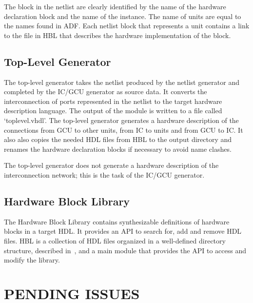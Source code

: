 \documentclass[a4paper,twoside]{tce}
\begin{document}
The block in the netlist are clearly identified by the name of the hardware
declaration block and the name of the instance. The name of units are equal
to the names found in ADF. Each netlist block that represents a unit
contains a link to the file in HBL that describes the hardware
implementation of the block.

\section{Top-Level Generator}

The top-level generator takes the netlist produced by the netlist generator
and completed by the IC/GCU generator as source data. It converts the
interconnection of ports represented in the netlist to the target hardware
description language. The output of the module is written to a file called
`toplevel.vhdl'.
%
The top-level generator generates a hardware description of the connections
from GCU to other units, from IC to units and from GCU to IC. It also also
copies the needed HDL files from HBL to the output directory and renames the
hardware declaration blocks if necessary to avoid name clashes.

The top-level generator does not generate a hardware description of the
interconnection network; this is the task of the IC/GCU generator.

\section{Hardware Block Library}

The Hardware Block Library contains synthesizable definitions of hardware
blocks in a target HDL. It provides an API to search for, add and remove HDL
files.  HBL is a collection of HDL files organized in a well-defined
directory structure, described in~\cite{ProGeSpecs}, and a main module that
provides the API to access and modify the library.

\chapter{PENDING ISSUES}



\cleardoublepage

\end{document}

